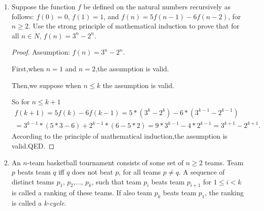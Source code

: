 \documentclass[12pt,a4paper]{article}
\theoremstyle{definition}
\begin{document}
\begin{enumerate}
    \item
    Suppose the function $f$ be defined on the natural numbers recursively as follows: $f(0)=0$, $f(1)=1$, and $f(n)=5f(n-1)-6f(n-2)$, for $n\geq 2$. Use the strong principle of mathematical induction to prove that for all $n\in N$, $f(n)=3^n-2^n$. 
    \begin{proof}
    	Assumption: $f(n)=3^n-2^n$.
        \par First,when $n=1$ and $n=2$,the assumption is valid.
        \par Then,we suppose when $n\leq k$ the assumption is valid. 
        \par So for  $n\leq k+1$
        \begin{equation}
        \begin{split}
        f(k+1)=5f(k)-6f(k-1)=5*(3^k-2^k)-6*(3^{k-1}-2^{k-1})
        \\=3^{k-1}*(5*3-6)+2^{k-1}*(6-5*2)=9*3^{k-1}-4*2^{k-1}=3^{k+1}-2^{k+1}.
        \end{split}
        \end{equation}
        According to the principle of mathematical induction,the assumption is valid.QED.
    \end{proof}

    \item
    An $n$-team basketball tournament consists of some set of $n\geq2$ teams. Team $p$ beats team $q$ iff $q$
does not beat $p$, for all teams $p\neq q$. A sequence of distinct teams $p_{1}$, $p_{2}$,..., $p_{k}$, such that team $p_{i}$ beats team $p_{i+1}$ for $1\leq i<k$ is called a ranking of these teams. If also team $p_{k}$ beats team $p_{1}$, the ranking is called a \emph{k-cycle}. 


\end{enumerate}
\end{document}
